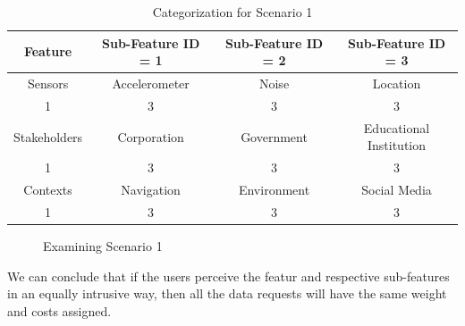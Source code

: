 \begin{table}[h!]
  \centering
  \caption{Categorization for Scenario 1}
  \label{tab:scenario11}
  \begin{tabular}{cccc}
    \toprule
    Feature & Sub-Feature ID = 1 & Sub-Feature ID = 2 & Sub-Feature ID = 3\\
    \midrule
    Sensors & Accelerometer & Noise & Location\\
     1 & 3 & 3 & 3\\ \hhline{====}
     Stakeholders & Corporation & Government & Educational Institution\\
     1 & 3 & 3 & 3\\ \hhline{====}
     Contexts & Navigation & Environment & Social Media\\
     1 & 3 & 3 & 3\\ 
    \bottomrule
  \end{tabular}
\end{table}
 
\begin{figure}[htp]
  \caption{Examining Scenario 1}
  \label{fig:scenatio11}
\end{figure}



We can conclude that if the users perceive the featur and respective sub-features in an equally intrusive way, then all the
data requests will have the same weight and costs assigned.

